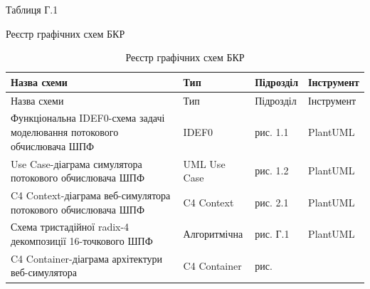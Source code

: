 \documentclass[
]{article}
\begin{document}
Таблиця Г.1

Реєстр графічних схем БКР

\begin{longtable}[]{@{}
  >{\raggedright\arraybackslash}p{}
  >{\raggedright\arraybackslash}p{}
  >{\raggedright\arraybackslash}p{}
  >{\raggedright\arraybackslash}p{}@{}}
\caption[Реєстр графічних схем БКР]{Реєстр графічних схем
БКР}\tabularnewline
\toprule\noalign{}
\begin{minipage}[b]{\linewidth}\raggedright
Назва схеми
\end{minipage} & \begin{minipage}[b]{\linewidth}\raggedright
Тип
\end{minipage} & \begin{minipage}[b]{\linewidth}\raggedright
Підрозділ
\end{minipage} & \begin{minipage}[b]{\linewidth}\raggedright
Інструмент
\end{minipage} \\
\midrule\noalign{}
\endfirsthead
\toprule\noalign{}
\begin{minipage}[b]{\linewidth}\raggedright
Назва схеми
\end{minipage} & \begin{minipage}[b]{\linewidth}\raggedright
Тип
\end{minipage} & \begin{minipage}[b]{\linewidth}\raggedright
Підрозділ
\end{minipage} & \begin{minipage}[b]{\linewidth}\raggedright
Інструмент
\end{minipage} \\
\midrule\noalign{}
\endhead
\bottomrule\noalign{}
\endlastfoot
Функціональна IDEF0-схема задачі моделювання потокового обчислювача ШПФ
& IDEF0 & рис. 1.1 & PlantUML \\
Use Case-діаграма симулятора потокового обчислювача ШПФ & UML Use Case &
рис. 1.2 & PlantUML \\
C4 Context-діаграма веб-симулятора потокового обчислювача ШПФ & C4
Context & рис. 2.1 & PlantUML \\
Схема тристадійної radix-4 декомпозиції 16-точкового ШПФ & Алгоритмічна
& рис. Г.1 & PlantUML \\
C4 Container-діаграма архітектури веб-симулятора & C4 Container & рис.

\end{longtable}
\end{document}
